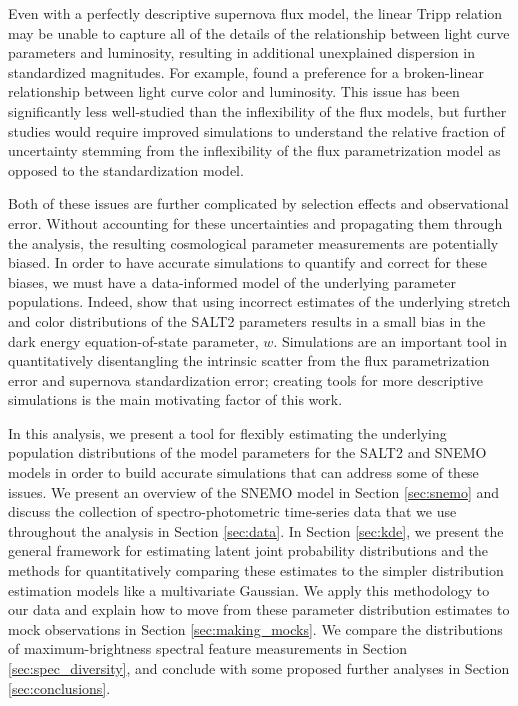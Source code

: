 Even with a perfectly descriptive supernova flux model, the linear Tripp relation may be unable to capture all of the details of the relationship between light curve parameters and luminosity, resulting in additional unexplained dispersion in standardized magnitudes. For example, \cite{Rubin2015} found a preference for a broken-linear relationship between light curve color and luminosity. This issue has been significantly less well-studied than the inflexibility of the flux models, but further studies would require improved simulations to understand the relative fraction of uncertainty stemming from the inflexibility of the flux parametrization model as opposed to the standardization model.

Both of these issues are further complicated by selection effects and observational error. Without accounting for these uncertainties and propagating them through the analysis, the resulting cosmological parameter measurements are potentially biased. In order to have accurate simulations to quantify and correct for these biases, we must have a data-informed model of the underlying parameter populations. Indeed, \cite{Scolnic2016} show that using incorrect estimates of the underlying stretch and color distributions of the SALT2 parameters results in a small bias in the dark energy equation-of-state parameter, $w$. Simulations are an important tool in quantitatively disentangling the intrinsic scatter from the flux parametrization error and supernova standardization error; creating tools for more descriptive simulations is the main motivating factor of this work.

In this analysis, we present a tool for flexibly estimating the underlying population distributions of the model parameters for the SALT2 and SNEMO models in order to build accurate simulations that can address some of these issues. We present an overview of the SNEMO model in Section \ref{sec:snemo} and discuss the collection of spectro-photometric time-series data that we use throughout the analysis in Section \ref{sec:data}. In Section \ref{sec:kde}, we present the general framework for estimating latent joint probability distributions and the methods for quantitatively comparing these estimates to the simpler distribution estimation models like a multivariate Gaussian. We apply this methodology to our data and explain how to move from these parameter distribution estimates to mock observations in Section \ref{sec:making_mocks}. We compare the distributions of maximum-brightness spectral feature measurements in Section \ref{sec:spec_diversity}, and conclude with some proposed further analyses in Section \ref{sec:conclusions}.

